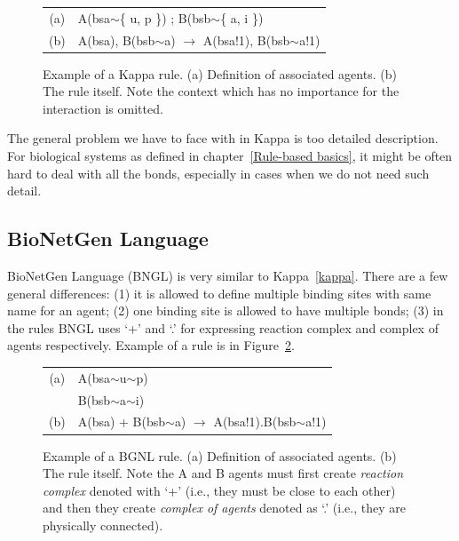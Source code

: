 \documentclass[12pt]{fithesis2}
\begin{document}
\begin{figure}
\begin{center}
\begin{tabular}{c l}
(a) & A(bsa$\sim$\{ u, p \}) ; B(bsb$\sim$\{ a, i \}) \\
(b) & A(bsa), B(bsb$\sim$a) $\rightarrow$ A(bsa!1), B(bsb$\sim$a!1) \\
\end{tabular}
\end{center}
\caption{Example of a Kappa rule. (a) Definition of associated agents. (b) The rule itself. Note the context which has no importance for the interaction is omitted.}\label{kappa-rule}
\end{figure}

The general problem we have to face with in Kappa is too detailed description. For biological systems as defined in chapter~\ref{Rule-based basics}, it might be often hard to deal with all the bonds, especially in cases when we do not need such detail.

\subsection{BioNetGen Language}
\label{bngl}

BioNetGen Language (BNGL) is very similar to Kappa~\ref{kappa}. There are a few general differences: (1) it is allowed to define multiple binding sites with same name for an agent; (2) one binding site is allowed to have multiple bonds; (3) in the rules BNGL uses `+' and `.' for expressing reaction complex and complex of agents respectively. Example of a rule is in Figure~\ref{bngl-rule}.

\begin{figure}
\begin{center}
\begin{tabular}{c l}
(a) & A(bsa$\sim$u$\sim$p) \\
	& B(bsb$\sim$a$\sim$i) \\
(b) & A(bsa) + B(bsb$\sim$a) $\rightarrow$ A(bsa!1).B(bsb$\sim$a!1) \\
\end{tabular}
\end{center}
\caption{Example of a BGNL rule. (a) Definition of associated agents. (b) The rule itself. Note the A and B agents must first create \emph{reaction complex} denoted with `+' (i.e., they must be close to each other) and then they create \emph{complex of agents} denoted as `.' (i.e., they are physically connected).}\label{bngl-rule}
\end{figure}
\end{document}
